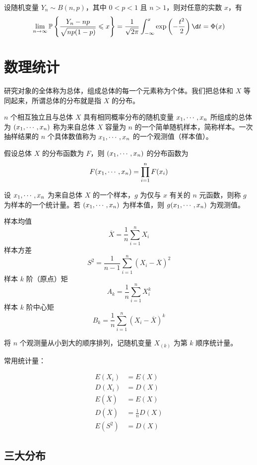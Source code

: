 \begin{theorem}
	设随机变量 $Y_n \sim B(n, p)$，其中 $0 < p < 1$ 且 $n > 1$，则对任意的实数 $x$，有
	\[ \lim_{n \to \infty} \bbP\left\{ \frac{Y_n - np}{\sqrt{np(1 - p)}} \leqslant x \right\} = \frac{1}{\sqrt{2 \pi}} \int_{-\infty}^x \exp\left(-\frac{t^2}{2}\right) \d t = \Phi(x)  \]
\end{theorem}

\section{数理统计}

研究对象的全体称为总体，组成总体的每一个元素称为个体。我们把总体和 $X$ 等同起来，所谓总体的分布就是指 $X$ 的分布。

$n$ 个相互独立且与总体 $X$ 具有相同概率分布的随机变量 $x_1,\cdots,x_n$ 所组成的总体为 $(x_1,\cdots,x_n)$ 称为来自总体 $X$ 容量为 $n$ 的一个简单随机样本，简称样本。一次抽样结果的 $n$ 个具体数值称为 $x_1,\cdots,x_n$ 的一个观测值（样本值）。

假设总体 $X$ 的分布函数为 $F$，则 $(x_1,\cdots,x_n)$ 的分布函数为
\[ F(x_1,\cdots,x_n) = \prod_{i=1}^n F(x_i) \]

设 $x_1,\cdots,x_n$ 为来自总体 $X$ 的一个样本，$g$ 为仅与 $x$ 有关的 $n$ 元函数，则称 $g$ 为样本的一个统计量。若 $(x_1,\cdots,x_n)$ 为样本值，则 $g(x_1,\cdots,x_n)$ 为观测值。

样本均值
\[ \overline{X} = \frac{1}{n} \sum_{i=1}^n X_i \]
样本方差
\[ S^2 = \frac{1}{n-1} \sum_{i=1}^n (X_i - \overline{X})^2 \]
样本 $k$ 阶（原点）矩
\[ A_k = \frac{1}{n} \sum_{i=1}^n X_i^k \]
样本 $k$ 阶中心矩
\[ B_k = \frac{1}{n} \sum_{i=1}^n (X_i - \overline{X})^k \]

将 $n$ 个观测量从小到大的顺序排列，记随机变量 $X_{(k)}$ 为第 $k$ 顺序统计量。

常用统计量：

\[
	\begin{aligned}
		E(X_i)          & = E(X)             \\
		D(X_i)          & = D(X)             \\
		E(\overline{X}) & = E(X)             \\
		D(\overline{X}) & = \frac{1}{n} D(X) \\
		E(S^2)          & = D(X)
	\end{aligned}
\]

\subsection{三大分布}


